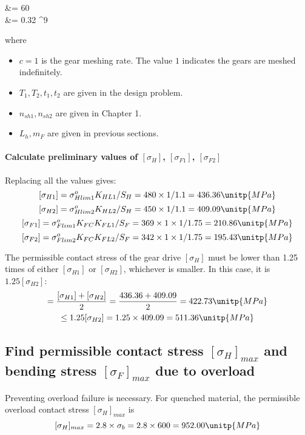 \begin{itemize}
\begin{flalign*}
	&= 60     \\
	&= 0.32 ^9
	\end{flalign*}
	where\begin{itemize}
		\item $ c=1 $ is the gear meshing rate. The value $ 1 $ indicates the gears are meshed indefinitely.
		\item $ T_1,T_2,t_1,t_2 $ are given in the design problem.
		\item $ n_{sh1}, n_{sh2} $ are given in Chapter 1.
		\item $ L_h, m_F $ are given in previous sections.
	\end{itemize}
\end{itemize}

\paragraph{Calculate preliminary values of $ [\sigma_H] $, $ [\sigma_{F1}] $, $ [\sigma_{F2}] $} Replacing all the values gives:\\
\[ [\sigma_{H1}] = \sigma_{Hlim1}^oK_{HL1}/S_H = 480\times 1/1.1 = 436.36 \unitp{MPa}\]
\[ [\sigma_{H2}] = \sigma_{Hlim2}^oK_{HL2}/S_H = 450\times 1/1.1 = 409.09 \unitp{MPa}\]
\[ [\sigma_{F1}] = \sigma_{Flim1}^oK_{FC}K_{FL1}/S_F = 369\times 1\times 1/1.75  = 210.86\unitp{MPa}\]
\[ [\sigma_{F2}] = \sigma_{Flim2}^oK_{FC}K_{FL2}/S_F = 342\times 1\times 1/1.75  = 195.43 \unitp{MPa}\]

The permissible contact stress of the gear drive $ [\sigma_H] $ must be lower than 1.25 times of either $ [\sigma_{H1}] $ or $ [\sigma_{H2}] $, whichever is smaller. In this case, it is $ 1.25[\sigma_{H2}]$:
\begin{multline*}
	[\sigma_H] =\dfrac{[\sigma_{H1}]+[\sigma_{H2}]}{2}= \dfrac{436.36+409.09}{2} = 422.73 \unitp{MPa}\\
	\leq 1.25[\sigma_{H2}] = 1.25\times 409.09= 511.36\unitp{MPa}
\end{multline*}

\subsection{Find permissible contact stress $ [\sigma_H]_{max} $ and bending stress $ [\sigma_F]_{max} $ due to overload}
Preventing overload failure is necessary. For quenched material, the permissible overload contact stress $ [\sigma_H]_{max} $ is
\[ [\sigma_H]_{max} = 2.8\times \sigma_b = 2.8\times 600 = 952.00\unitp{MPa} \]


